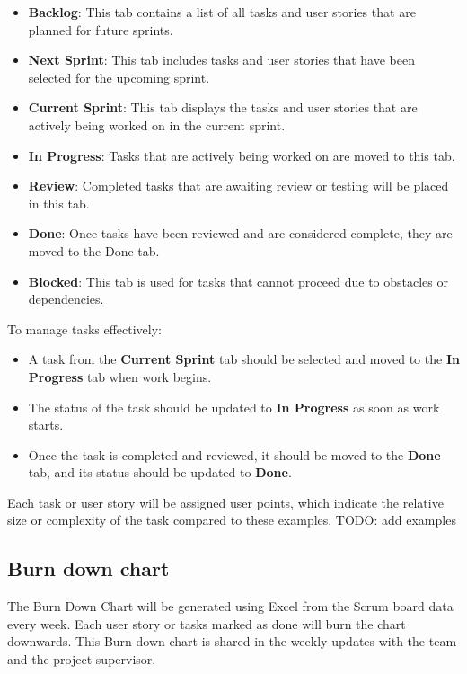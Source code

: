 \documentclass{projdoc}
\begin{document}
\begin{itemize}
    \item \textbf{Backlog}: This tab contains a list of all tasks and user stories that are planned for future sprints.
    \item \textbf{Next Sprint}: This tab includes tasks and user stories that have been selected for the upcoming sprint.
    \item \textbf{Current Sprint}: This tab displays the tasks and user stories that are actively being worked on in the current sprint.
    \item \textbf{In Progress}: Tasks that are actively being worked on are moved to this tab.
    \item \textbf{Review}: Completed tasks that are awaiting review or testing will be placed in this tab.
    \item \textbf{Done}: Once tasks have been reviewed and are considered complete, they are moved to the Done tab.
    \item \textbf{Blocked}: This tab is used for tasks that cannot proceed due to obstacles or dependencies.
\end{itemize}

\noindent
To manage tasks effectively:
\begin{itemize}
    \item A task from the \textbf{Current Sprint} tab should be selected and moved to the \textbf{In Progress} tab when work begins. 
    \item The status of the task should be updated to \textbf{In Progress} as soon as work starts.
    \item Once the task is completed and reviewed, it should be moved to the \textbf{Done} tab, and its status should be updated to \textbf{Done}.
\end{itemize}

\noindent
Each task or user story will be assigned user points, which indicate the relative size or complexity of the task compared to these examples.
TODO: add examples

\subsection{Burn down chart}
The Burn Down Chart will be generated using Excel from the Scrum board data every week.
Each user story or tasks marked as done will burn the chart downwards.
This Burn down chart is shared in the weekly updates with the team and the project supervisor.
\newpage
\end{document}

